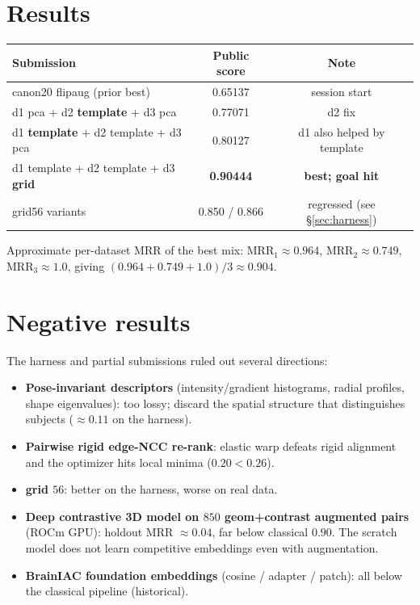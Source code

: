 \documentclass[11pt]{article}
\begin{document}
\section{Results}

\begin{center}
\begin{tabular}{@{}lcc@{}}
\toprule
Submission & Public score & Note \\
\midrule
canon20 flipaug (prior best)                  & 0.65137 & session start \\
d1 pca + d2 \textbf{template} + d3 pca          & 0.77071 & d2 fix \\
d1 \textbf{template} + d2 template + d3 pca     & 0.80127 & d1 also helped by template \\
d1 template + d2 template + d3 \textbf{grid}    & \textbf{0.90444} & \textbf{best; goal hit} \\
grid56 variants                                & 0.850 / 0.866 & regressed (see \S\ref{sec:harness}) \\
\bottomrule
\end{tabular}
\end{center}

\noindent Approximate per-dataset MRR of the best mix:
$\text{MRR}_1\!\approx\!0.964$, $\text{MRR}_2\!\approx\!0.749$,
$\text{MRR}_3\!\approx\!1.0$, giving $(0.964+0.749+1.0)/3\approx0.904$.

\section{Negative results}

The harness and partial submissions ruled out several directions:
\begin{itemize}[nosep]
  \item \textbf{Pose-invariant descriptors} (intensity/gradient histograms, radial
        profiles, shape eigenvalues): too lossy; discard the spatial structure that
        distinguishes subjects ($\approx0.11$ on the harness).
  \item \textbf{Pairwise rigid edge-NCC re-rank}: elastic warp defeats rigid
        alignment and the optimizer hits local minima ($0.20<0.26$).
  \item \textbf{grid $56$}: better on the harness, worse on real data.
  \item \textbf{Deep contrastive 3D model on $850$ geom+contrast augmented pairs}
        (ROCm GPU): holdout MRR $\approx0.04$, far below classical $0.90$. The
        scratch model does not learn competitive embeddings even with augmentation.
  \item \textbf{BrainIAC foundation embeddings} (cosine / adapter / patch): all
        below the classical pipeline (historical).
\end{itemize}
\end{document}
